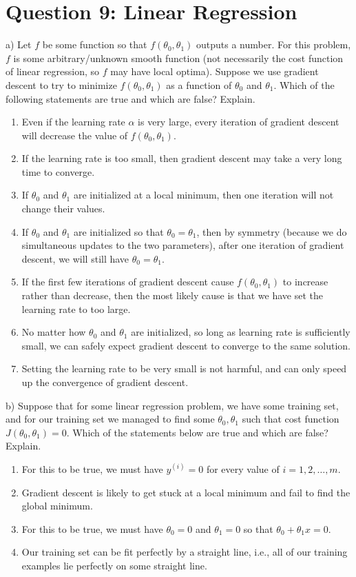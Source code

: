 \documentclass[12pt]{article}
\begin{document}
	\section*{Question 9: Linear Regression}
	a) Let $f$ be some function so that $f(\theta_0,\theta_1)$ outputs a number. For this problem, $f$ is some arbitrary/unknown smooth function (not necessarily the cost function of linear regression, so $f$ may have local optima). Suppose we use gradient descent to try to minimize $f(\theta_0,\theta_1)$ as a function of $\theta_0$ and $\theta_1$. Which of the following statements are true and which are false? Explain.
	\begin{enumerate}
		\item Even if the learning rate $\alpha$ is very large, every iteration of gradient descent will decrease the value of $f(\theta_0,\theta_1)$.
		\item If the learning rate is too small, then gradient descent may take a very long time to converge.
		\item If $\theta_0$ and $\theta_1$ are initialized at a local minimum, then one iteration will not change their values.
		\item If $\theta_0$ and $\theta_1$ are initialized so that $\theta_0=\theta_1$, then by symmetry (because we do simultaneous updates to the two parameters), after one iteration of gradient descent, we will still have $\theta_0=\theta_1$.
		\item If the first few iterations of gradient descent cause $f(\theta_0,\theta_1)$ to increase rather than decrease, then the most likely cause is that we have set the learning rate to too large.
		\item No matter how $\theta_0$ and $\theta_1$ are initialized, so long as learning rate is sufficiently small, we can safely expect gradient descent to converge to the same solution.
		\item Setting the learning rate to be very small is not harmful, and can only speed up the convergence of gradient descent.
	\end{enumerate}
	
	b) Suppose that for some linear regression problem, we have some training set, and for our training set we managed to find some $\theta_0, \theta_1$ such that cost function $J(\theta_0,\theta_1)=0$. Which of the statements below are true and which are false? Explain.
	\begin{enumerate}
		\item For this to be true, we must have $y^{(i)}=0$ for every value of $i=1,2,\dots,m$.
		\item Gradient descent is likely to get stuck at a local minimum and fail to find the global minimum.
		\item For this to be true, we must have $\theta_0=0$ and $\theta_1=0$ so that $\theta_0 + \theta_1x=0$.
		\item Our training set can be fit perfectly by a straight line, i.e., all of our training examples lie perfectly on some straight line.
	\end{enumerate}
	
\end{document}

